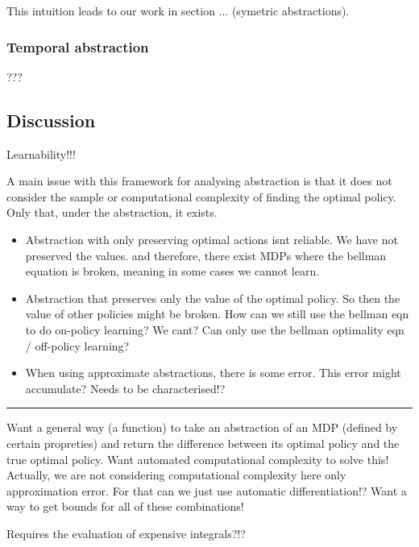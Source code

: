 This intuition leads to our work in section ... (symetric abstractions).

\subsubsection{Temporal abstraction}

???


\subsection{Discussion}

Learnability!!!

A main issue with this framework for analysing abstraction is that it does not consider
the sample or computational complexity of finding the optimal policy. Only that, under the abstraction,
it exists.

\begin{itemize}
  \item Abstraction with only preserving optimal actions isnt reliable. We have not preserved the values.
  and therefore, there exist MDPs where the bellman equation is broken, meaning in some cases we cannot learn.
  \item Abstraction that preserves only the value of the optimal policy. So then the value of other policies might be broken.
  How can we still use the bellman eqn to do on-policy learning? We cant? Can only use the bellman optimality eqn / off-policy learning?
  \item When using approximate abstractions, there is some error. This error might accumulate? Needs to be characterised!?
\end{itemize}


\begin{center}\rule{0.5\linewidth}{\linethickness}\end{center}

Want a general way (a function) to take an abstraction of an MDP
(defined by certain propreties) and return the difference between its
optimal policy and the true optimal policy. Want automated computational
complexity to solve this! Actually, we are not considering computational
complexity here only approximation error. For that can we just use
automatic differentiation!? Want a way to get bounds for all of these
combinations!

Requires the evaluation of expensive integrals?!?
